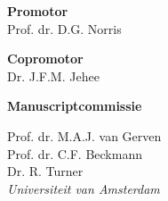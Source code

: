 {\setlength{\parindent}{0cm}\raggedright\smaller

\hspace{-12pt}\textbf{Promotor}\\
Prof. dr. D.G. Norris
\vspace{12pt}

\hspace{-12pt}\textbf{Copromotor}\\
Dr. J.F.M. Jehee
\vspace{20pt}

\hspace{-12pt}\textbf{Manuscriptcommissie}

\vspace{6pt}
Prof. dr. M.A.J. van Gerven\\

\vspace{6pt}
Prof. dr. C.F. Beckmann\\

\vspace{6pt}
Dr. R. Turner\\
\textit{Universiteit van Amsterdam}

\vfill
}

\newpage


\thispagestyle{empty}

{\setlength{\parindent}{0cm}
\begin{flushright}
\end{flushright}
}

